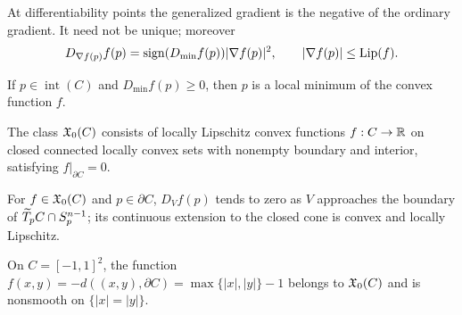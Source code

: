 \begin{lemma}
\label{lem:chow-iii-h30-generalized-gradient-properties}

At differentiability points the generalized gradient is the negative of the ordinary
gradient.  It need not be unique; moreover
\[
D_{\nabla f(p)}f(p)=\operatorname{sign}(D_{\min}f(p))|\nabla f(p)|^2,
\qquad |\nabla f(p)|\le\operatorname{Lip}(f).
\]
\end{lemma}

\begin{lemma}
\label{lem:chow-iii-h31-critical-local-minimum}

If $p\in\operatorname{int}(C)$ and $D_{\min}f(p)\ge0$, then $p$ is a local minimum
of the convex function $f$.
\end{lemma}

\begin{definition}
\label{def:chow-iii-h32-Xzero}
The class $\mathfrak X_0(C)$ consists of locally Lipschitz convex functions $f:C\to\mathbb R$ on
closed connected locally convex sets with nonempty boundary and interior, satisfying
$f|_{\partial C}=0$.
\end{definition}

\begin{lemma}
\label{lem:chow-iii-h33-boundary-directional-extension}

For $f\in\mathfrak X_0(C)$ and $p\in\partial C$, $D_Vf(p)$ tends to zero as $V$ approaches
the boundary of $\widetilde T_pC\cap S_p^{n-1}$; its continuous extension to the closed cone is
convex and locally Lipschitz.
\end{lemma}

\begin{example}
\label{ex:chow-iii-h34-square-convex-function}
On $C=[-1,1]^2$, the function $f(x,y)=-d((x,y),\partial C)=\max\{|x|,|y|\}-1$
belongs to $\mathfrak X_0(C)$ and is nonsmooth on $\{|x|=|y|\}$.
\end{example}

